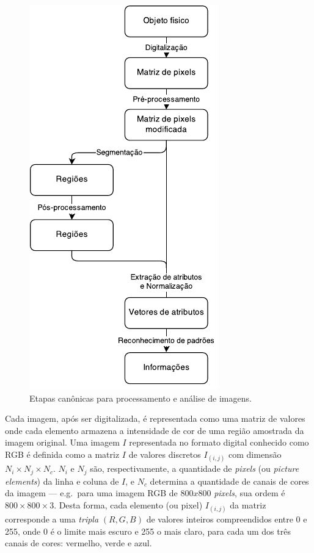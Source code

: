 \begin{figure}[ht!]
\begin{center}
        \includegraphics[scale=1.]{figs/etapas_pdi}
      \caption{Etapas canônicas para processamento e análise de imagens.}
        \label{fig:etapas-pdi}
\end{center}
\end{figure}

Cada imagem, após ser digitalizada, é representada como uma matriz de
valores onde cada elemento armazena a intensidade de cor de uma região
amostrada da imagem original. Uma imagem $I$ representada no formato
digital conhecido como RGB é definida como a matriz $I$ de valores
discretos $I_{(i,j)}$ com dimensão $N_i \times N_j \times N_c$. $N_i$
e $N_j$ são, respectivamente, a quantidade de \textit{pixels} (ou
\textit{picture elements}) da linha e coluna de $I$, e $N_c$ determina
a quantidade de canais de cores da imagem --- e.g.\ para uma imagem
RGB de $800 x 800$ \textit{pixels}, sua ordem é $800 \times 800 \times
3$. Desta forma, cada elemento (ou pixel) $I_{(i,j)}$ da matriz
corresponde a uma \emph{tripla} $(R, G, B)$ de valores inteiros
compreendidos entre 0 e 255, onde 0 é o limite mais escuro e 255 o
mais claro, para cada um dos três canais de cores: vermelho, verde e
azul.

